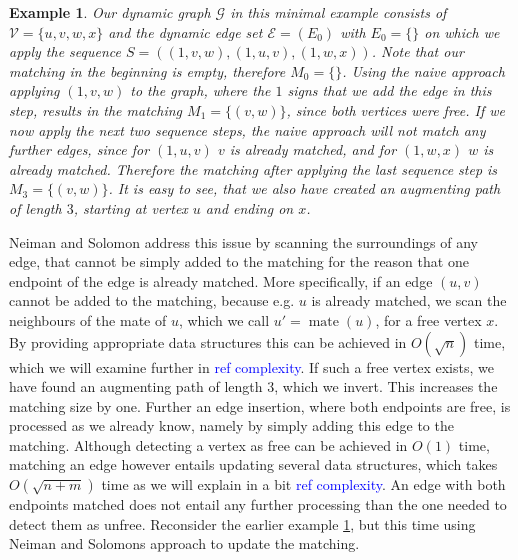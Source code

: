 \documentclass{article}      %
\newcommand\todo[1]{\textcolor{blue}{#1}}
\newtheorem{example}{Example}[subsection]
\DeclareMathOperator\mate{mate}
\begin{document}
\begin{example}
\label{ex:naive-aug-path}
Our dynamic graph $\mathcal{G}$ in this minimal example consists of $\mathcal{V}=\{u,v,w,x\}$ and the dynamic edge set $\mathcal{E}=( E_0 )$ with $E_0=\{\}$ on which we apply the sequence $S = ((1,v,w),(1,u,v),(1,w,x))$. Note that our matching in the beginning is empty, therefore $M_0=\{\}$. Using the naive approach applying $(1,v,w)$ to the graph, where the $1$ signs that we add the edge in this step, results in the matching $M_1=\{(v,w)\}$, since both vertices were free. If we now apply the next two sequence steps, the naive approach will not match any further edges, since for $(1,u,v)$ $v$ is already matched, and for $(1,w,x)$ $w$ is already matched. Therefore the matching after applying the last sequence step is $M_3=\{(v,w)\}$. It is easy to see, that we also have created an augmenting path of length $3$, starting at vertex $u$ and ending on $x$.
\end{example}

\noindent 
Neiman and Solomon address this issue by scanning the surroundings of any edge, that cannot be simply added to the matching for the reason that one endpoint of the edge is already matched. More specifically, if an edge $(u,v)$ cannot be added to the matching, because e.g. $u$ is already matched, we scan the neighbours of the mate of $u$, which we call $u'=\mate(u)$, for a free vertex $x$. By providing appropriate data structures this can be achieved in $O(\sqrt{n})$ time, which we will examine further in \todo{ref complexity}. If such a free vertex exists, we have found an augmenting path of length 3, which we invert. This increases the matching size by one. Further an edge insertion, where both endpoints are free, is processed as we already know, namely by simply adding this edge to the matching. Although detecting a vertex as free can be achieved in $O(1)$ time, matching an edge however entails updating several data structures, which takes $O(\sqrt{n+m})$ time as we will explain in a bit \todo{ref complexity}. An edge with both endpoints matched does not entail any further processing than the one needed to detect them as unfree. Reconsider the earlier example \ref{ex:naive-aug-path}, but this time using Neiman and Solomons approach to update the matching.
\end{document}

